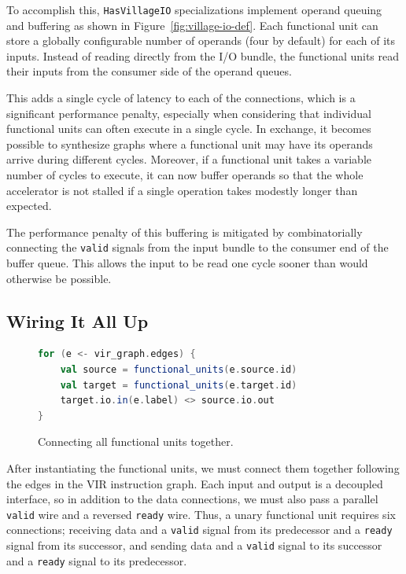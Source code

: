 \documentclass[sigconf, nonacm]{acmart}
\begin{document}
To accomplish this, \texttt{HasVillageIO} specializations implement operand queuing and buffering as shown in Figure~\ref{fig:village-io-def}.
Each functional unit can store a globally configurable number of operands (four by default) for each of its inputs.
Instead of reading directly from the I/O bundle, the functional units read their inputs from the consumer side of the operand queues.

This adds a single cycle of latency to each of the connections, which is a significant performance penalty, especially when considering that individual functional units can often execute in a single cycle.
In exchange, it becomes possible to synthesize graphs where a functional unit may have its operands arrive during different cycles.
Moreover, if a functional unit takes a variable number of cycles to execute, it can now buffer operands so that the whole accelerator is not stalled if a single operation takes modestly longer than expected.

The performance penalty of this buffering is mitigated by combinatorially connecting the \texttt{valid} signals from the input bundle to the consumer end of the buffer queue.
This allows the input to be read one cycle sooner than would otherwise be possible.

\subsection{Wiring It All Up}

\begin{figure}
	\begin{center}
		\begin{lstlisting}[language=scala]
for (e <- vir_graph.edges) {
	val source = functional_units(e.source.id)
	val target = functional_units(e.target.id)
	target.io.in(e.label) <> source.io.out
}
		\end{lstlisting}
	\end{center}
	\caption{Connecting all functional units together.}
	\label{fig:village-connections}
\end{figure}

After instantiating the functional units, we must connect them together following the edges in the VIR instruction graph.
Each input and output is a decoupled interface, so in addition to the data connections, we must also pass a parallel \texttt{valid} wire and a reversed \texttt{ready} wire.
Thus, a unary functional unit requires six connections; receiving data and a \texttt{valid} signal from its predecessor and a \texttt{ready} signal from its successor, and sending data and a \texttt{valid} signal to its successor and a \texttt{ready} signal to its predecessor.
\end{document}
